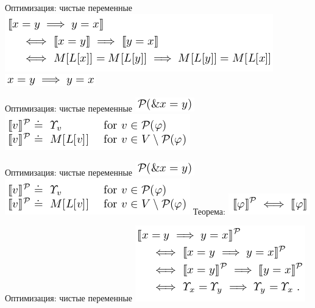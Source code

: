 \documentclass{beamer}
\begin{document}
\begin{frame}{Оптимизация: чистые переменные}
\includegraphics[scale=0.5]{ex_pure.png}\newline
\includegraphics[scale=0.5]{ex_pure2.png}\newline
\end{frame}

\begin{frame}{Оптимизация: чистые переменные}
\includegraphics[scale=0.5]{pure1.png}\newline
\includegraphics[scale=0.5]{pure2.png}\newline
\end{frame}

\begin{frame}{Оптимизация: чистые переменные}
\includegraphics[scale=0.5]{pure1.png}\newline
\includegraphics[scale=0.5]{pure2.png}\newline
Теорема:\newline
\includegraphics[scale=0.5]{theorem.png}\newline
\end{frame}

\begin{frame}{Оптимизация: чистые переменные}
\includegraphics[scale=0.5]{ex_pure3.png}\newline
\end{frame}
\end{document}
